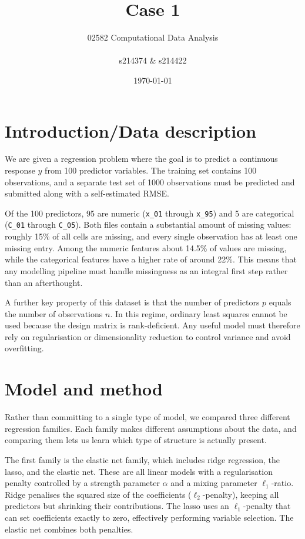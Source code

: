 \documentclass{article}
\title{Case 1}
\author{02582 Computational Data Analysis \\ \\ s214374 \& s214422}
\date{\today}
\begin{document}
\maketitle

\section*{Introduction/Data description}

We are given a regression problem where the goal is to predict a continuous response $y$ from 100 predictor variables. The training set contains 100 observations, and a separate test set of 1000 observations must be predicted and submitted along with a self-estimated RMSE.

Of the 100 predictors, 95 are numeric (\texttt{x\_01} through \texttt{x\_95}) and 5 are categorical (\texttt{C\_01} through \texttt{C\_05}). Both files contain a substantial amount of missing values: roughly 15\% of all cells are missing, and every single observation has at least one missing entry. Among the numeric features about 14.5\% of values are missing, while the categorical features have a higher rate of around 22\%. This means that any modelling pipeline must handle missingness as an integral first step rather than an afterthought.

A further key property of this dataset is that the number of predictors $p$ equals the number of observations $n$. In this regime, ordinary least squares cannot be used because the design matrix is rank-deficient. Any useful model must therefore rely on regularisation or dimensionality reduction to control variance and avoid overfitting.

\section*{Model and method}

Rather than committing to a single type of model, we compared three different regression families. Each family makes different assumptions about the data, and comparing them lets us learn which type of structure is actually present.

The first family is the elastic net family, which includes ridge regression, the lasso, and the elastic net. These are all linear models with a regularisation penalty controlled by a strength parameter $\alpha$ and a mixing parameter $\ell_{1}$-ratio. Ridge penalises the squared size of the coefficients ($\ell_{2}$-penalty), keeping all predictors but shrinking their contributions. The lasso uses an $\ell_{1}$-penalty that can set coefficients exactly to zero, effectively performing variable selection. The elastic net combines both penalties.
\end{document}
